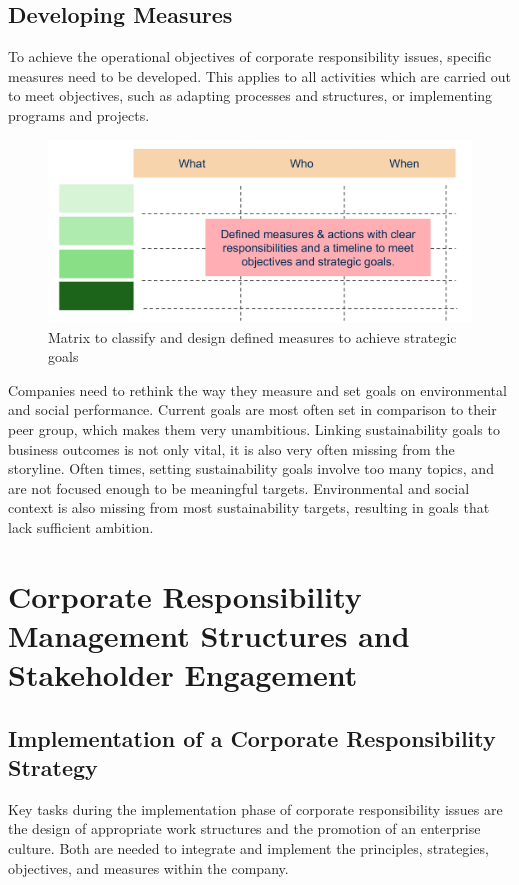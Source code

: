 \documentclass[11pt]{article}
\theoremstyle{definition}
\begin{document}
\clearpage
\subsection{Developing Measures}
To achieve the operational objectives of corporate responsibility issues, specific measures need to be developed. This applies to all activities which are carried out to meet objectives, such as adapting processes and structures, or implementing programs and projects.
\begin{figure}[H]
	\centering
	\includegraphics[width=0.7\linewidth]{img/developing_achievable_measures}
	\caption{Matrix to classify and design defined measures to achieve strategic goals}
	\label{fig:developingachievablemeasures}
\end{figure}
Companies need to rethink the way they measure and set goals on environmental and social performance. Current goals are most often set in comparison to their peer group, which makes them very unambitious. Linking sustainability goals to business outcomes is not only vital, it is also very often missing from the storyline. Often times, setting sustainability goals involve too many topics, and are not focused enough to be meaningful targets. Environmental and social context is also missing from most sustainability targets, resulting in goals that lack sufficient ambition.

\section{Corporate Responsibility Management Structures and Stakeholder Engagement}
\subsection{Implementation of a Corporate Responsibility Strategy}
Key tasks during the implementation phase of corporate responsibility issues are the design of appropriate work structures and the promotion of an enterprise culture. Both are needed to integrate and implement the principles, strategies, objectives, and measures within the company.
\end{document}

